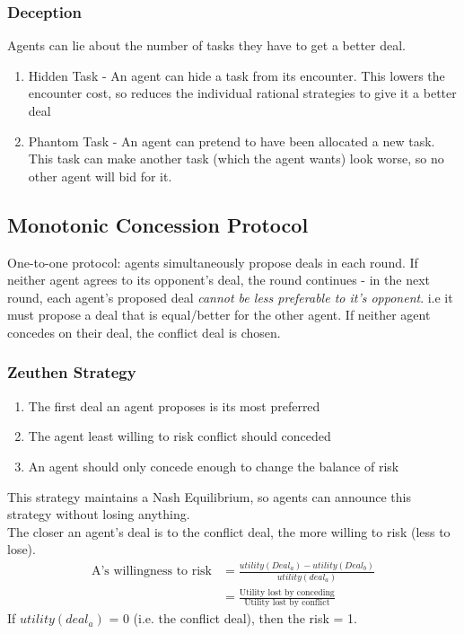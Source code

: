 \subsubsection{Deception}
Agents can lie about the number of tasks they have to get a better deal. 
\begin{enumerate}
    \item Hidden Task - An agent can hide a task from its encounter. This lowers the encounter cost, so reduces the individual rational strategies to give it a better deal
    \item Phantom Task - An agent can pretend to have been allocated a new task. This task can make another task (which the agent wants) look worse, so no other agent will bid for it. 
\end{enumerate}

\subsection{Monotonic Concession Protocol}
One-to-one protocol: agents simultaneously propose deals in each round. If neither agent agrees to its opponent's deal, the round continues - in the next round, each agent's proposed deal \emph{cannot be less preferable to it's opponent}. i.e it must propose a deal that is equal/better for the other agent. If neither agent concedes on their deal, the conflict deal is chosen.

\subsubsection{Zeuthen Strategy}
\begin{enumerate}
    \item The first deal an agent proposes is its most preferred
    \item The agent least willing to risk conflict should conceded
    \item An agent should only concede enough to change the balance of risk
\end{enumerate}
This strategy maintains a Nash Equilibrium, so agents can announce this strategy without losing anything. \\

The closer an agent's deal is to the conflict deal, the more willing to risk (less to lose). 
\begin{align*}
    \text{A's willingness to risk} &= \frac{utility(Deal_a) - utility(Deal_b)}{utility(deal_a)} \nonumber \\
    &= \frac{\text{Utility lost by conceding}}{\text{Utility lost by conflict}} \nonumber
\end{align*}
If $utility(deal_a)$ = 0 (i.e. the conflict deal), then the risk = 1.
